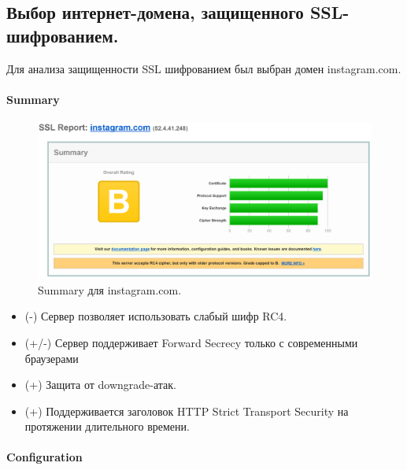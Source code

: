 \documentclass[10pt,a4paper]{article}
\begin{document}
\subsection{Выбор интернет-домена, защищенного SSL-шифрованием.}
Для анализа защищенности SSL шифрованием был выбран домен instagram.com.

\paragraph{Summary\\}

\begin{figure}[h]
\centering
\includegraphics[width=\textwidth]{instagram_com_summary}
\caption{Summary для instagram.com.}
\end{figure}


\begin{itemize}
\item {(-) Сервер позволяет использовать слабый шифр RC4.}
\item {(+/-) Сервер поддерживает Forward Secrecy только с современными браузерами}
\item {(+) Защита от downgrade-атак.}
\item {(+) Поддерживается заголовок HTTP Strict Transport Security на протяжении длительного времени.}

\end{itemize}

\paragraph{Configuration\\}
\end{document}
